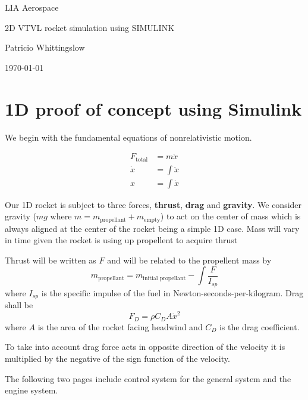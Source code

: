 \documentclass[11pt, titlepage]{article}
\begin{document}
\begin{titlepage}
	
	\centering
	{\small LIA Aerospace \par}
	
	
	\vspace{8cm}
	{\Huge 2D VTVL rocket simulation using SIMULINK \par}
	\vspace{2cm}
	{ \large {
			Patricio Whittingslow \par}}
	\vspace{4cm}
	\today
	
\end{titlepage}
	
	\section{1D proof of concept using Simulink}
	We begin with the fundamental equations of nonrelativistic motion.
	
	\begin{align}
		F_{\text{total}} &= m\ddot{x} \\
		\dot{x} &= \int \ddot{x} \\
		x &= \int \dot{x}
	\end{align}
	
Our 1D rocket is subject to three forces, \textbf{thrust}, \textbf{drag} and \textbf{gravity}.
\newcommand{\Isp}{I_{sp}}
 We consider gravity ($mg$ where $m = m_{\text{propellant}}+m_{\text{empty}}$) to act on the center of mass which is always aligned at the center of the rocket being a simple 1D case. Mass will vary in time given the rocket is using up propellent to acquire thrust
 
Thrust will be written as $F$ and will be related to the propellent mass by
 \begin{equation}
m_{\text{propellant}} = m_{\text{initial propellant}} - \int  \frac{F}{\Isp}
\end{equation}
where $\Isp$ is the specific impulse of the fuel in Newton-seconds-per-kilogram.
Drag shall be
\[
F_D = \rho C_D A \dot{x}^2
\] 
where $A$ is the area of the rocket facing headwind and $C_D$ is the drag coefficient.

To take into account drag force acts in opposite direction of the velocity it is multiplied by the negative of the sign function of the velocity.

The following two pages include control system for the general system and the engine system.
\end{document}
